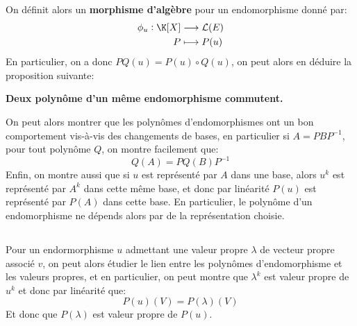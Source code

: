 \subsection*{}
On définit alors un \textbf{morphisme d'algèbre} pour un endomorphisme donné par:
\[
   \begin{aligned}
      \phi_u:  \K[X] &\longrightarrow \mathcal{L}(E) \\
      P &\longmapsto P(u)
   \end{aligned}
\]
En particulier, on a donc \(PQ(u) = P(u) \circ Q(u)\), on peut alors en déduire la proposition suivante:
\begin{center}
   \textbf{Deux polynôme d'un même endomorphisme commutent.}
\end{center}
On peut alors montrer que les polynômes d'endomorphismes ont un bon comportement vis-à-vis
des changements de bases, en particulier si \(A = PBP^{-1}\), pour tout polynôme \(Q\), on montre facilement que:
\[
   Q(A) = PQ(B)P^{-1}   
\]
Enfin, on montre aussi que si \(u\) est représenté par \(A\) dans une base, alors \(u^k\) est représenté par \(A^k\) dans cette même base, et donc par linéarité \(P(u)\) est représenté par \(P(A)\) dans cette base. En particulier, le polynôme d'un endomorphisme ne dépends alors par de la représentation choisie.
\subsection*{}
Pour un endormorphisme \(u\) admettant une valeur propre \(\lambda\) de vecteur propre associé \(v\), on peut alors étudier le lien entre les polynômes d'endomorphisme et les valeurs propres, et en particulier, on peut montre que \(\lambda^k\) est valeur propre de \(u^k\) et donc par linéarité que:
\[
   P(u)(V) = P(\lambda)(V)
\]
Et donc que \(P(\lambda)\) est valeur propre de \(P(u)\).
